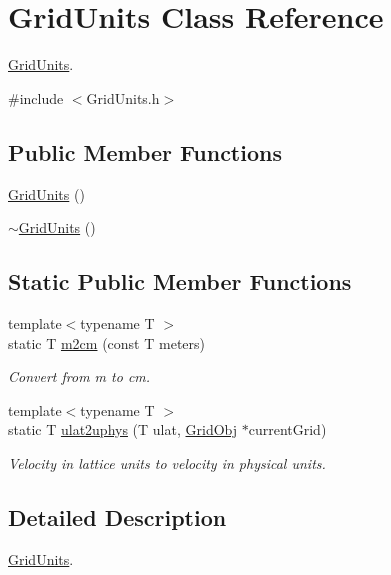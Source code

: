 \hypertarget{class_grid_units}{}\section{Grid\+Units Class Reference}
\label{class_grid_units}


\hyperlink{class_grid_units}{Grid\+Units}.  




{\ttfamily \#include $<$Grid\+Units.\+h$>$}

\subsection*{Public Member Functions}
\begin{DoxyCompactItemize}
\item 
\hyperlink{class_grid_units_a5f9360a53252d5420a6a785e42feca21}{Grid\+Units} ()
\item 
\hyperlink{class_grid_units_a082a527c0b79a09eed048527fe283f9e}{$\sim$\+Grid\+Units} ()
\end{DoxyCompactItemize}
\subsection*{Static Public Member Functions}
\begin{DoxyCompactItemize}
\item 
{\footnotesize template$<$typename T $>$ }\\static T \hyperlink{class_grid_units_abddfadd5165980c7f6f9ba3d086a79c7}{m2cm} (const T meters)
\begin{DoxyCompactList}\small\item\em Convert from m to cm. \end{DoxyCompactList}\item 
{\footnotesize template$<$typename T $>$ }\\static T \hyperlink{class_grid_units_a94d339355f8e81b46405c99c0b7a81aa}{ulat2uphys} (T ulat, \hyperlink{class_grid_obj}{Grid\+Obj} $\ast$current\+Grid)
\begin{DoxyCompactList}\small\item\em Velocity in lattice units to velocity in physical units. \end{DoxyCompactList}\end{DoxyCompactItemize}


\subsection{Detailed Description}
\hyperlink{class_grid_units}{Grid\+Units}. 

